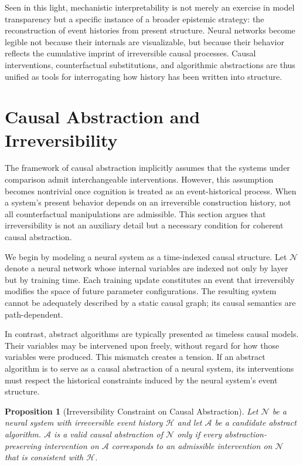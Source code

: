 \documentclass[11pt]{article}
\newtheorem{proposition}{Proposition}
\begin{document}
Seen in this light, mechanistic interpretability is not merely an exercise in
model transparency but a specific instance of a broader epistemic strategy: the
reconstruction of event histories from present structure. Neural networks become
legible not because their internals are visualizable, but because their behavior
reflects the cumulative imprint of irreversible causal processes. Causal
interventions, counterfactual substitutions, and algorithmic abstractions are
thus unified as tools for interrogating how history has been written into
structure.


\section{Causal Abstraction and Irreversibility}

The framework of causal abstraction implicitly assumes that the systems under
comparison admit interchangeable interventions. However, this assumption
becomes nontrivial once cognition is treated as an event-historical process.
When a system’s present behavior depends on an irreversible construction
history, not all counterfactual manipulations are admissible. This section
argues that irreversibility is not an auxiliary detail but a necessary condition
for coherent causal abstraction.

We begin by modeling a neural system as a time-indexed causal structure. Let
$\mathcal{N}$ denote a neural network whose internal variables are indexed not
only by layer but by training time. Each training update constitutes an event
that irreversibly modifies the space of future parameter configurations. The
resulting system cannot be adequately described by a static causal graph; its
causal semantics are path-dependent.

In contrast, abstract algorithms are typically presented as timeless causal
models. Their variables may be intervened upon freely, without regard for how
those variables were produced. This mismatch creates a tension. If an abstract
algorithm is to serve as a causal abstraction of a neural system, its
interventions must respect the historical constraints induced by the neural
system’s event structure.

\begin{proposition}[Irreversibility Constraint on Causal Abstraction]
Let $\mathcal{N}$ be a neural system with irreversible event history $\mathcal{H}$
and let $\mathcal{A}$ be a candidate abstract algorithm. $\mathcal{A}$ is a valid
causal abstraction of $\mathcal{N}$ only if every abstraction-preserving
intervention on $\mathcal{A}$ corresponds to an admissible intervention on
$\mathcal{N}$ that is consistent with $\mathcal{H}$.
\end{proposition}
\end{document}
